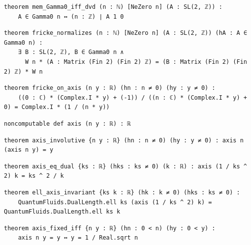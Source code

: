 \begin{lstlisting}[style=leancat]
theorem mem_Gamma0_iff_dvd (n : ℕ) [NeZero n] (A : SL(2, ℤ)) :
    A ∈ Gamma0 n ↔ (n : ℤ) ∣ A 1 0
\end{lstlisting}

\begin{lstlisting}[style=leancat]
theorem fricke_normalizes (n : ℕ) [NeZero n] (A : SL(2, ℤ)) (hA : A ∈ Gamma0 n) :
    ∃ B : SL(2, ℤ), B ∈ Gamma0 n ∧
      W n * (A : Matrix (Fin 2) (Fin 2) ℤ) = (B : Matrix (Fin 2) (Fin 2) ℤ) * W n
\end{lstlisting}

\begin{lstlisting}[style=leancat]
theorem fricke_on_axis (n y : ℝ) (hn : n ≠ 0) (hy : y ≠ 0) :
    ((0 : ℂ) * (Complex.I * y) + (-1)) / ((n : ℂ) * (Complex.I * y) + 0) = Complex.I * (1 / (n * y))
\end{lstlisting}

\begin{lstlisting}[style=leancat]
noncomputable def axis (n y : ℝ) : ℝ
\end{lstlisting}

\begin{lstlisting}[style=leancat]
theorem axis_involutive {n y : ℝ} (hn : n ≠ 0) (hy : y ≠ 0) : axis n (axis n y) = y
\end{lstlisting}

\begin{lstlisting}[style=leancat]
theorem axis_eq_dual {ks : ℝ} (hks : ks ≠ 0) (k : ℝ) : axis (1 / ks ^ 2) k = ks ^ 2 / k
\end{lstlisting}

\begin{lstlisting}[style=leancat]
theorem ell_axis_invariant {ks k : ℝ} (hk : k ≠ 0) (hks : ks ≠ 0) :
    QuantumFluids.DualLength.ell ks (axis (1 / ks ^ 2) k) = QuantumFluids.DualLength.ell ks k
\end{lstlisting}

\begin{lstlisting}[style=leancat]
theorem axis_fixed_iff {n y : ℝ} (hn : 0 < n) (hy : 0 < y) :
    axis n y = y ↔ y = 1 / Real.sqrt n
\end{lstlisting}

